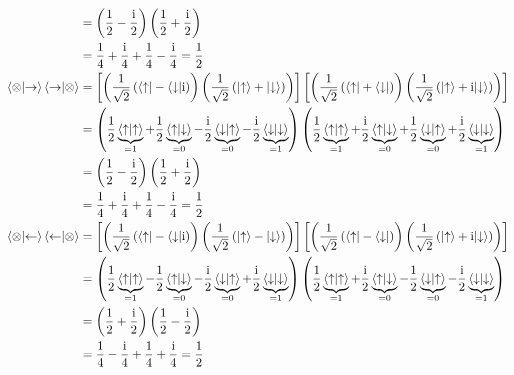 \begin{align*}
    &= \left( \frac{1}{2} - \frac{\text{i}}{2} \right) \left( \frac{1}{2} + \frac{\text{i}}{2} \right)\\
    &= \frac{1}{4} + \frac{\text{i}}{4} + \frac{1}{4} - \frac{\text{i}}{4} = \frac{1}{2}\\
        \braket{\otimes}{\to}\braket{\to}{\otimes} &=
    \left[ \left( \frac{1}{\sqrt{2}}\left(\langle\uparrow\rvert-\langle\downarrow\rvert\text{i}\right) \right) 
    \left( \frac{1}{\sqrt{2}}\left(\lvert\uparrow\rangle+\lvert\downarrow\rangle\right) \right) \right] 
    \left[ \left( \frac{1}{\sqrt{2}}\left(\langle\uparrow\rvert+\langle\downarrow\rvert\right) \right) 
    \left( \frac{1}{\sqrt{2}}\left(\lvert\uparrow\rangle+\text{i}\lvert\downarrow\rangle\right) \right) \right]\\
    &= \left( \frac{1}{2} \underbrace{\braket{\uparrow}{\uparrow}}_{=1} 
    + \frac{1}{2} \underbrace{\braket{\uparrow}{\downarrow}}_{=0}
    - \frac{\text{i}}{2} \underbrace{\braket{\downarrow}{\uparrow}}_{=0} 
    - \frac{\text{i}}{2} \underbrace{\braket{\downarrow}{\downarrow}}_{=1} \right)
    \left( \frac{1}{2} \underbrace{\braket{\uparrow}{\uparrow}}_{=1} 
    + \frac{\text{i}}{2} \underbrace{\braket{\uparrow}{\downarrow}}_{=0}
    + \frac{1}{2} \underbrace{\braket{\downarrow}{\uparrow}}_{=0} 
    + \frac{\text{i}}{2} \underbrace{\braket{\downarrow}{\downarrow}}_{=1} \right)\\
    &= \left( \frac{1}{2} - \frac{\text{i}}{2} \right) \left( \frac{1}{2} + \frac{\text{i}}{2} \right)\\
    &= \frac{1}{4} + \frac{\text{i}}{4} + \frac{1}{4} - \frac{\text{i}}{4} = \frac{1}{2}\\
        \braket{\otimes}{\leftarrow}\braket{\leftarrow}{\otimes} &=
    \left[ \left( \frac{1}{\sqrt{2}}\left(\langle\uparrow\rvert-\langle\downarrow\rvert\text{i}\right) \right) 
    \left( \frac{1}{\sqrt{2}}\left(\lvert\uparrow\rangle-\lvert\downarrow\rangle\right) \right) \right] 
    \left[ \left( \frac{1}{\sqrt{2}}\left(\langle\uparrow\rvert-\langle\downarrow\rvert\right) \right) 
    \left( \frac{1}{\sqrt{2}}\left(\lvert\uparrow\rangle+\text{i}\lvert\downarrow\rangle\right) \right) \right]\\
    &= \left( \frac{1}{2} \underbrace{\braket{\uparrow}{\uparrow}}_{=1} 
    - \frac{1}{2} \underbrace{\braket{\uparrow}{\downarrow}}_{=0}
    - \frac{\text{i}}{2} \underbrace{\braket{\downarrow}{\uparrow}}_{=0} 
    + \frac{\text{i}}{2} \underbrace{\braket{\downarrow}{\downarrow}}_{=1} \right)
    \left( \frac{1}{2} \underbrace{\braket{\uparrow}{\uparrow}}_{=1} 
    + \frac{\text{i}}{2} \underbrace{\braket{\uparrow}{\downarrow}}_{=0}
    - \frac{1}{2} \underbrace{\braket{\downarrow}{\uparrow}}_{=0} 
    - \frac{\text{i}}{2} \underbrace{\braket{\downarrow}{\downarrow}}_{=1} \right)\\
    &= \left( \frac{1}{2} + \frac{\text{i}}{2} \right) \left( \frac{1}{2} - \frac{\text{i}}{2} \right)\\
    &= \frac{1}{4} - \frac{\text{i}}{4} + \frac{1}{4} + \frac{\text{i}}{4} = \frac{1}{2}
    \end{align*}

